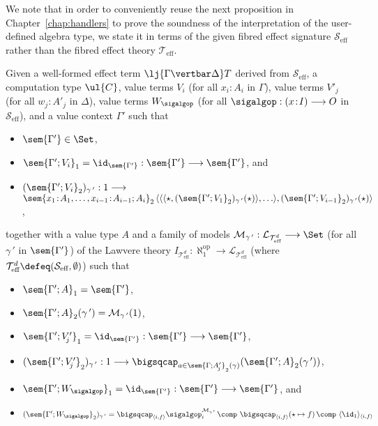 We note that in order to conveniently reuse the next proposition in Chapter~\ref{chap:handlers} to prove the soundness of the interpretation of the user-defined algebra type, we state it in terms of the given fibred effect signature $\mathcal{S}_{\text{eff}}$ rather than the fibred effect theory $\mathcal{T}_{\text{eff}}$.

\begin{proposition}
\label{prop:relatingsemanticsoffibeffectterms}
Given a well-formed effect term $\lj {\Gamma \vertbar \Delta} T$ derived from $\mathcal{S}_{\text{eff}}$, a computation type $\ul{C}$, value terms $V_{i}$ (for all $x_i \!:\! A_i$ in $\Gamma$), value terms $V'_{\!j}$ (for all $w_{\!j} \!:\! A'_{\!j}$ in $\Delta$), value terms $W_{\sigalgop}$ (for all $\sigalgop : (x \!:\! I) \longrightarrow O$ in $\mathcal{S}_{\text{eff}}$), and a value context $\Gamma'$ such that
\begin{itemize}
\item $\sem{\Gamma'} \in \Set$, 
\item $\sem{\Gamma';V_i}_1 = \id_{\sem{\Gamma'}}  : \sem{\Gamma'} \longrightarrow \sem{\Gamma'}$, and 
\item $(\sem{\Gamma';V_i}_2)_{\gamma\,'} : 1 \longrightarrow $
\\[-7.5mm]

\hspace{1cm} $\sem{x_1 \!:\! A_1, \ldots, x_{i-1} \!:\! A_{i - 1};A_i}_2\, \langle \langle \langle \star , (\sem{\Gamma'; V_1}_2)_{\gamma\,'}(\star) \rangle , \ldots \rangle , (\sem{\Gamma'; V_{i - 1}}_2)_{\gamma\,'}(\star) \rangle$, 
\end{itemize}
together with a value type $A$ and a family of models $\mathcal{M}_{\gamma\,'} : \mathcal{L}_{\mathcal{T}^{d}_{\text{eff}}} \longrightarrow \Set$ (for all $\gamma\,'$ in $\sem{\Gamma'}$) of the Lawvere theory $I_{\mathcal{T}^{d}_{\text{eff}}} : \aleph_{\!\!1}^{\text{op}} \longrightarrow \mathcal{L}_{\mathcal{T}^{d}_{\text{eff}}}$ (where ${\mathcal{T}^{d}_{\text{eff}}} \defeq (\mathcal{S}_{\text{eff}}, \emptyset)$) such that
\begin{itemize}
\item $\sem{\Gamma';A}_1 = \sem{\Gamma'}$, 
\item $\sem{\Gamma';A}_2(\gamma\,') = \mathcal{M}_{\gamma\,'}(1)$, 
\item $\sem{\Gamma';V'_{\!j}}_1 = \id_{\sem{\Gamma'}}  : \sem{\Gamma'} \longrightarrow \sem{\Gamma'}$, 
\item $(\sem{\Gamma';V'_{\!j}}_2)_{\gamma\,'} : 1 \longrightarrow \bigsqcap_{a \in \sem{\Gamma;A'_{\!j}}_2(\gamma)}(\sem{\Gamma';A}_2(\gamma\,'))$, 
\item $\sem{\Gamma';W_{\sigalgop}}_1 = \id_{\sem{\Gamma'}} : \sem{\Gamma'} \longrightarrow \sem{\Gamma'}$, and
\item $(\sem{\Gamma';W_{\sigalgop}}_2)_{\gamma\,'} = \bigsqcap_{\langle i , f \rangle} \sigalgop^{\mathcal{M}_{\gamma\,'}}_{i} \,\comp\,\, \bigsqcap_{\langle i , f \rangle} (\star \mapsto f) \,\comp\,\, \langle \id_1 \rangle_{\langle i , f \rangle}$
\\[-7.5mm]


\end{itemize}
\end{proposition}
